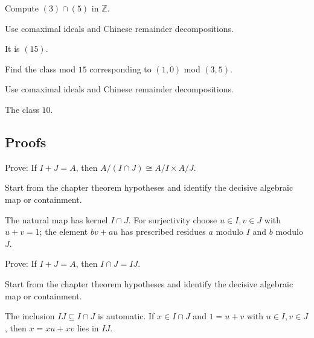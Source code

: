 \begin{exercise}[Intersection]\label{exr:v04-expand-04}
Compute $(3)\cap(5)$ in $\mathbb Z$.
\end{exercise}
\begin{hint}
Use comaximal ideals and Chinese remainder decompositions.
\end{hint}
\begin{solution}
It is $(15)$.
\end{solution}

\begin{exercise}[Idempotent]\label{exr:v04-expand-05}
Find the class mod $15$ corresponding to $(1,0)$ mod $(3,5)$.
\end{exercise}
\begin{hint}
Use comaximal ideals and Chinese remainder decompositions.
\end{hint}
\begin{solution}
The class $10$.
\end{solution}

\subsection*{Proofs}

\begin{exercise}\label{exr:v04-expand-06}
Prove: If $I+J=A$, then $A/(I\cap J)\cong A/I\times A/J$.
\end{exercise}
\begin{hint}
Start from the chapter theorem hypotheses and identify the decisive algebraic map or containment.
\end{hint}
\begin{solution}
The natural map has kernel $I\cap J$. For surjectivity choose $u\in I,v\in J$ with $u+v=1$; the element $bv+au$ has prescribed residues $a$ modulo $I$ and $b$ modulo $J$.
\end{solution}

\begin{exercise}\label{exr:v04-expand-07}
Prove: If $I+J=A$, then $I\cap J=IJ$.
\end{exercise}
\begin{hint}
Start from the chapter theorem hypotheses and identify the decisive algebraic map or containment.
\end{hint}
\begin{solution}
The inclusion $IJ\subseteq I\cap J$ is automatic. If $x\in I\cap J$ and $1=u+v$ with $u\in I,v\in J$, then $x=xu+xv$ lies in $IJ$.
\end{solution}

